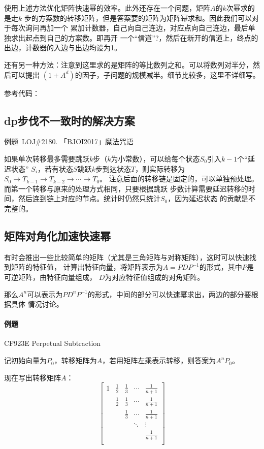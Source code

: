 使用上述方法优化矩阵快速幂的效率。此外还存在一个问题，矩阵$A$的$k$次幂求的是走$k$
步的方案数的转移矩阵，但是答案要的矩阵为矩阵幂求和。因此我们可以对于每次询问再加一个
累加计数器，自己向自己连边，对应点向自己连边，最后单独求出起点到自己的方案数。即再开
一个``信道''?，然后在新开的信道上，终点的出边，计数器的入边与出边均设为1。

还有另一种方法：注意到这里求的是矩阵的等比数列之和。可以将数列对半分，然后可以提出
$(1+A^d)$的因子，子问题的规模减半。细节比较多，这里不详细写。

参考代码：


\subsection{dp步伐不一致时的解决方案}
例题~LOJ\#2180. 「BJOI2017」魔法咒语

如果单次转移最多需要跳跃$k$步（$k$为小常数），可以给每个状态$S_0$引入$k-1$个``延迟状态''
$S_i$，若有状态$S$跳跃$k$步到达状态$T$，则实际转移为
$S_0\rightarrow T_{k-1} \rightarrow T_{k-2} \rightarrow \cdots \rightarrow T_0$。
注意后面的转移链是固定的，可以单独预处理。而第一个转移与原来的处理方式相同，只要根据跳跃
步数计算需要延迟转移的时间，然后连到链上对应的节点。统计时仍然只统计$S_0$，因为延迟状态
的贡献是不完整的。

\subsection{矩阵对角化加速快速幂}
有时会推出一些比较简单的矩阵（尤其是三角矩阵与对称矩阵），这时可以快速找到矩阵的特征值，
计算出特征向量，将矩阵表示为$A=PDP^{-1}$的形式，其中$P$是可逆矩阵，由特征向量组成，
$D$为对应特征值组成的对角矩阵。

那么$A^n$可以表示为$PD^nP^{-1}$的形式，中间的部分可以快速幂求出，两边的部分要根据具体
情况讨论。

\paragraph{例题} CF923E Perpetual Subtraction

记初始向量为$P_0$，转移矩阵为$A$，若用矩阵左乘表示转移，则答案为$A^nP_0$。

现在写出转移矩阵$A$：
\begin{displaymath}
    \left[
    \begin{array}{ccccc}
        1&\frac{1}{2}&\frac{1}{3}&\cdots&\frac{1}{n+1}\\
         &\frac{1}{2}&\frac{1}{3}&\cdots&\frac{1}{n+1}\\
         &           &\frac{1}{3}&\cdots&\frac{1}{n+1}\\
         &           &           &\ddots&\vdots\\
         &           &           &      &\frac{1}{n+1}\\
    \end{array}
    \right]
\end{displaymath}

